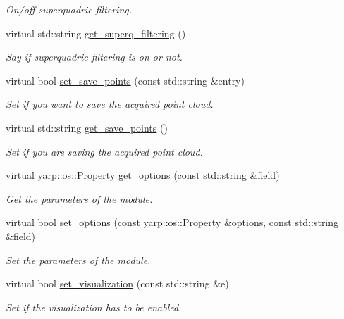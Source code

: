 \begin{DoxyCompactItemize}
\begin{DoxyCompactList}\small\item\em On/off superquadric filtering. \end{DoxyCompactList}\item 
virtual std\+::string \mbox{\hyperlink{classsuperquadricModel__IDL_af99d29d42b96b8db6c90c5fd48cfb253}{get\+\_\+superq\+\_\+filtering}} ()
\begin{DoxyCompactList}\small\item\em Say if superquadric filtering is on or not. \end{DoxyCompactList}\item 
virtual bool \mbox{\hyperlink{classsuperquadricModel__IDL_a8368b783845a3e5ae7e0706ee5b888c0}{set\+\_\+save\+\_\+points}} (const std\+::string \&entry)
\begin{DoxyCompactList}\small\item\em Set if you want to save the acquired point cloud. \end{DoxyCompactList}\item 
virtual std\+::string \mbox{\hyperlink{classsuperquadricModel__IDL_a4b101fe118a1ee912468562bde0b0df4}{get\+\_\+save\+\_\+points}} ()
\begin{DoxyCompactList}\small\item\em Set if you are saving the acquired point cloud. \end{DoxyCompactList}\item 
virtual yarp\+::os\+::\+Property \mbox{\hyperlink{classsuperquadricModel__IDL_a50b388a29852f9d8b57a0bbb276d4675}{get\+\_\+options}} (const std\+::string \&field)
\begin{DoxyCompactList}\small\item\em Get the parameters of the module. \end{DoxyCompactList}\item 
virtual bool \mbox{\hyperlink{classsuperquadricModel__IDL_a575e0b591f07206b0d6c29e5cfeead37}{set\+\_\+options}} (const yarp\+::os\+::\+Property \&options, const std\+::string \&field)
\begin{DoxyCompactList}\small\item\em Set the parameters of the module. \end{DoxyCompactList}\item 
virtual bool \mbox{\hyperlink{classsuperquadricModel__IDL_a651c741e9b01b25d46be96b06b91011d}{set\+\_\+visualization}} (const std\+::string \&e)
\begin{DoxyCompactList}\small\item\em Set if the visualization has to be enabled. \end{DoxyCompactList}\item 

\end{DoxyCompactItemize}
